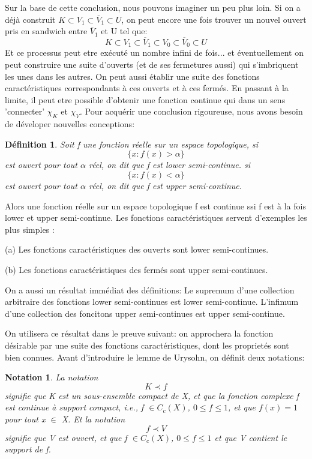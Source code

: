 \documentclass{article}
\newtheorem{definition}{Définition}[section]
\newtheorem{notation}{Notation}
\begin{document}
Sur la base de cette conclusion, nous pouvons imaginer un peu plus loin. Si on a déjà construit $K \subset V_{1} \subset \overline{V}_{1} \subset U$, on peut encore une fois trouver un nouvel ouvert pris en sandwich entre $\overline{V}_{1}$ et U tel que:
\[K \subset V_{1} \subset \overline{V}_{1} \subset V_{0} \subset \overline{V}_{0}\subset U\]
Et ce processus peut etre exécuté un nombre infini de fois... et éventuellement on peut construire une suite d'ouverts (et de ses fermetures aussi) qui s'imbriquent les unes dans les autres. On peut aussi établir une suite des fonctions caractéristiques correspondants à ces ouverts et à ces fermés. En passant à la limite, il peut etre possible d'obtenir une fonction continue qui dans un sens 'connecter' $\chi _{K}$ et $\chi _{V}$. Pour acquérir une conclusion rigoureuse, nous avons besoin de déveloper nouvelles conceptions: 


\begin{definition}
Soit f une fonction réelle sur un espace topologique, si 
\[\{ x:f(x)>\alpha \}\]
est ouvert pour tout $\alpha$ réel, on dit que f est lower semi-continue.
si 
\[\{ x:f(x)<\alpha \} \]
est ouvert pour tout $\alpha$ réel, on dit que f est upper semi-continue.
\end{definition}
Alors une fonction réelle sur un espace topologique f est continue ssi f est à la fois lower et upper semi-continue. Les fonctions caractéristiques servent d'exemples les plus simples : \par
(a) Les fonctions caractéristiques des ouverts sont lower semi-continues.\par
(b) Les fonctions caractéristiques des fermés sont upper semi-continues.\par
On a aussi un résultat immédiat des définitions: Le supremum d'une collection arbitraire des fonctions lower semi-continues est lower semi-continue. L'infimum d'une collection des foncitons upper semi-continues est upper semi-continue. \par
On utilisera ce résultat dans le preuve suivant: on approchera la fonction désirable par une suite des fonctions caractéristiques, dont les proprietés sont bien connues.
Avant d'introduire le lemme de Urysohn, on définit deux notations:
\begin{notation}
La notation 
\[K \prec f\]
signifie que K est un sous-ensemble compact de X, et que la fonction complexe f est continue à support compact, i.e., f $\in C_{c}( X ) $, $ 0 \leq  f \leq  1$, et que $f( x ) = 1 $ pour tout x $\in$ X. Et la notation 
\[f \prec V\]
signifie que V est ouvert, et que f $\in C_{c}( X )$, $ 0 \leq  f \leq  1$ et que V contient le support de f. 
\end{notation}
\end{document}

